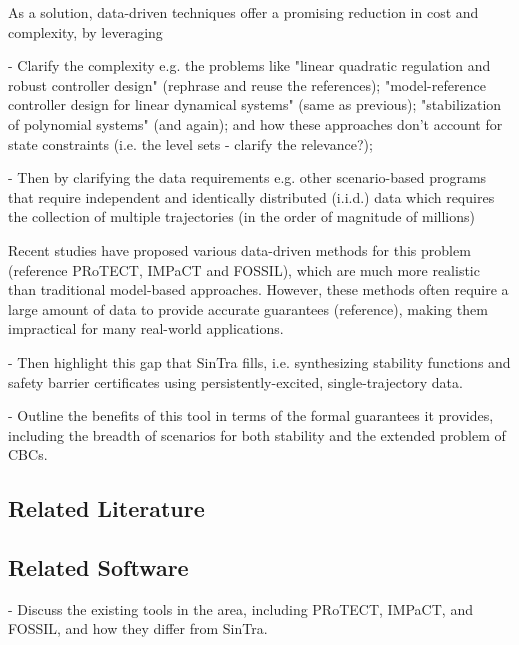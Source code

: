 \documentclass[sigconf]{acmart}
\begin{document}
As a solution, data-driven techniques offer a promising reduction in cost and complexity, by leveraging

- Clarify the complexity e.g. the problems like "linear quadratic regulation and robust controller design" (rephrase and reuse the references); "model-reference controller design for linear dynamical systems" (same as previous); "stabilization of polynomial systems" (and again); and how these approaches don't account for state constraints (i.e. the level sets - clarify the relevance?);

- Then by clarifying the data requirements e.g. other scenario-based programs that require independent and identically distributed (i.i.d.) data which requires the collection of multiple trajectories (in the order of magnitude of millions)

Recent studies have proposed various data-driven methods for this problem (reference PRoTECT, IMPaCT and FOSSIL), which are much more realistic than traditional model-based approaches.
However, these methods often require a large amount of data to provide accurate guarantees (reference), making them impractical for many real-world applications.

- Then highlight this gap that SinTra fills, i.e. synthesizing stability functions and safety barrier certificates using persistently-excited, single-trajectory data.

- Outline the benefits of this tool in terms of the formal guarantees it provides, including the breadth of scenarios for both stability and the extended problem of CBCs.

\subsection{Related Literature}\label{subsec:related-literature}

\subsection{Related Software}\label{subsec:related-software}
- Discuss the existing tools in the area, including PRoTECT, IMPaCT, and FOSSIL, and how they differ from SinTra.
\end{document}
